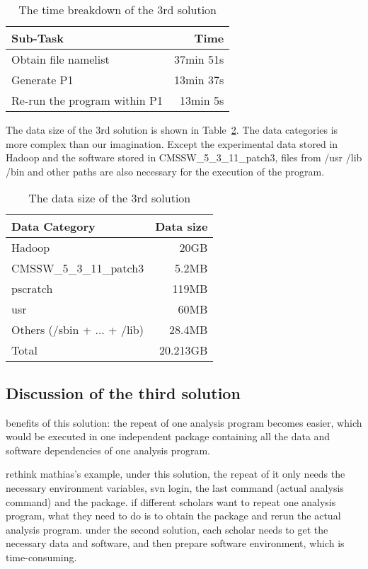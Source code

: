 \documentclass{acm_proc_article-sp}
\begin{document}
\begin{table}
    \centering
    \begin{tabular}{|l|r|}
    \hline
    Sub-Task & Time \\ \hline
    Obtain file namelist & 37min 51s \\ \hline
    Generate P1 & 13min 37s \\ \hline
    Re-run the program within P1 & 13min 5s \\ \hline
    \end{tabular}
    \caption{The time breakdown of the 3rd solution}
    \label{table:time-3rd}
\end{table}

The data size of the 3rd solution is shown in Table~\ref{table:datasize-3rd}. The data categories is more complex than our imagination. Except the experimental data stored in Hadoop and the software stored in CMSSW\_5\_3\_11\_patch3, files from /usr /lib /bin and other paths are also necessary for the execution of the program.

\begin{table}
    \centering
    \begin{tabular}{|l|r|}
    \hline
    Data Category & Data size \\ \hline
    Hadoop & 20GB \\ \hline
    CMSSW\_5\_3\_11\_patch3 & 5.2MB \\ \hline
    pscratch & 119MB \\ \hline
    usr & 60MB \\ \hline
    Others (/sbin + ... + /lib) & 28.4MB \\ \hline
    Total & 20.213GB \\ \hline
    \end{tabular}
    \caption{The data size of the 3rd solution}
    \label{table:datasize-3rd}
\end{table}    

\subsection{Discussion of the third solution}
benefits of this solution: the repeat of one analysis program becomes easier, which would be executed in one independent package containing all the data and software dependencies of one analysis program. 

rethink mathias's example, under this solution, the repeat of it only needs the necessary environment variables, svn login,  the last command (actual analysis command) and the package. if different scholars want to repeat one analysis program, what they need to do is to obtain the package and rerun the actual analysis program. under the second solution, each scholar needs to get the necessary data and software, and then prepare software environment, which is time-consuming. 
\end{document}
